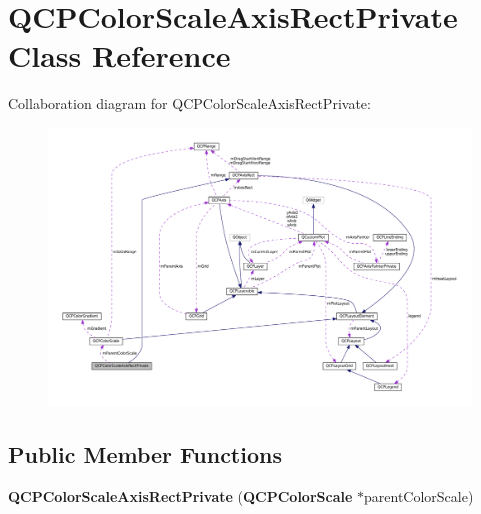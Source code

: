 \section{Q\+C\+P\+Color\+Scale\+Axis\+Rect\+Private Class Reference}
\label{class_q_c_p_color_scale_axis_rect_private}


Collaboration diagram for Q\+C\+P\+Color\+Scale\+Axis\+Rect\+Private\+:
\nopagebreak
\begin{figure}[H]
\begin{center}
\leavevmode
\includegraphics[width=350pt]{class_q_c_p_color_scale_axis_rect_private__coll__graph}
\end{center}
\end{figure}
\subsection*{Public Member Functions}
\begin{DoxyCompactItemize}
\item 
{\bf Q\+C\+P\+Color\+Scale\+Axis\+Rect\+Private} ({\bf Q\+C\+P\+Color\+Scale} $\ast$parent\+Color\+Scale)
\end{DoxyCompactItemize}
